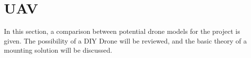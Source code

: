 \newpage
\section{UAV}
In this section, a comparison between potential drone models for the project is given. The possibility of a DIY Drone will be reviewed, and the basic theory of a mounting solution will be discussed.



